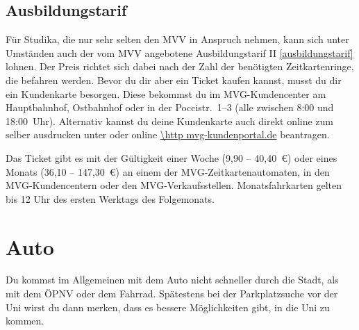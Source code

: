 \begin{urlList}
\end{urlList}

\subsection{Ausbildungstarif}
Für Studika, die nur sehr selten den MVV in Anspruch nehmen, kann sich unter Umständen auch der vom MVV angebotene Ausbildungstarif II \ref{ausbildungstarif} lohnen. Der Preis richtet sich dabei nach der Zahl der benötigten Zeitkartenringe, die befahren werden. Bevor du dir aber ein Ticket kaufen kannst, musst du dir ein Kundenkarte besorgen. Diese bekommst du im MVG-Kundencenter am Hauptbahnhof, Ostbahnhof oder in der Poccistr.~1--3 (alle zwischen 8:00 und 18:00~Uhr). Alternativ kannst du deine Kundenkarte auch direkt online zum selber ausdrucken unter oder online \url{\http mvg-kundenportal.de} beantragen.

Das Ticket gibt es mit der Gültigkeit einer Woche (9,90 -- 40,40~€) oder eines Monats (36,10 -- 147,30~€) an einem der MVG-Zeitkartenautomaten, in den MVG-Kundencentern oder den MVG-Verkaufsstellen. Monatsfahrkarten gelten bis 12 Uhr des ersten Werktags des Folgemonats.

\begin{urlList}
\end{urlList}

\section{Auto}
Du kommst im Allgemeinen mit dem Auto nicht schneller durch die Stadt, als mit dem ÖPNV oder dem Fahrrad. Spätestens bei der Parkplatzsuche vor der Uni wirst du dann merken, dass es bessere Möglichkeiten gibt, in die Uni zu kommen.
